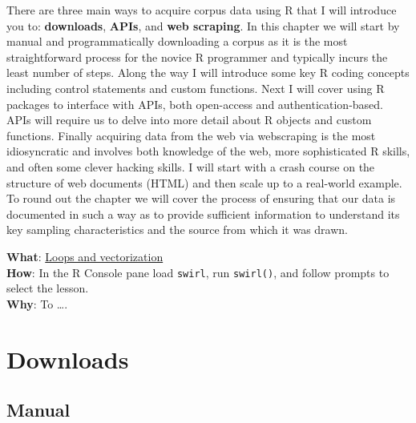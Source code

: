 \documentclass[
  letterpaper,
]{latex/krantz}
\begin{document}
There are three main ways to acquire corpus data using R that I will
introduce you to: \textbf{downloads}, \textbf{APIs}, and \textbf{web
scraping}. In this chapter we will start by manual and programmatically
downloading a corpus as it is the most straightforward process for the
novice R programmer and typically incurs the least number of steps.
Along the way I will introduce some key R coding concepts including
control statements and custom functions. Next I will cover using R
packages to interface with APIs, both open-access and
authentication-based. APIs will require us to delve into more detail
about R objects and custom functions. Finally acquiring data from the
web via webscraping is the most idiosyncratic and involves both
knowledge of the web, more sophisticated R skills, and often some clever
hacking skills. I will start with a crash course on the structure of web
documents (HTML) and then scale up to a real-world example. To round out
the chapter we will cover the process of ensuring that our data is
documented in such a way as to provide sufficient information to
understand its key sampling characteristics and the source from which it
was drawn.

\begin{tcolorbox}[enhanced jigsaw, toprule=.15mm, bottomtitle=1mm, coltitle=black, title=\textcolor{quarto-callout-tip-color}{\faLightbulb}\hspace{0.5em}{Swirl}, left=2mm, colframe=quarto-callout-tip-color-frame, bottomrule=.15mm, colbacktitle=quarto-callout-tip-color!10!white, leftrule=.75mm, colback=white, titlerule=0mm, breakable, toptitle=1mm, opacityback=0, arc=.35mm, rightrule=.15mm, opacitybacktitle=0.6]

\textbf{What}: \href{https://github.com/lin380/swirl}{Loops and
vectorization}\\
\textbf{How}: In the R Console pane load \texttt{swirl}, run
\texttt{swirl()}, and follow prompts to select the lesson.\\
\textbf{Why}: To \ldots.

\end{tcolorbox}

\hypertarget{downloads}{%
\section{Downloads}\label{downloads}}

\hypertarget{manual}{%
\subsection{Manual}\label{manual}}
\end{document}
